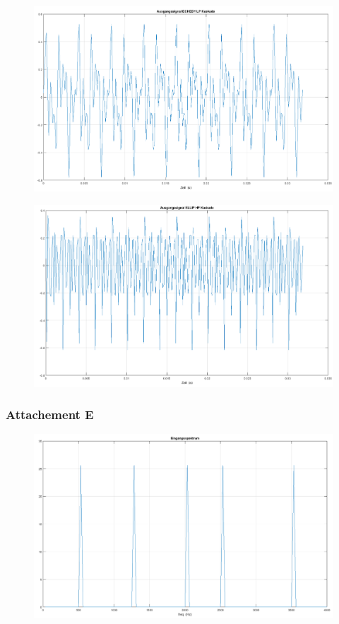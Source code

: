 \clearpage

\begin{figure}[h]
\centering
\includegraphics[width=0.7\linewidth]{Bilder/Attachment_D_Ausgangssignal_cheby_lp}
\caption{}
\label{fig:Attachment_D_Ausgangssignal_cheby_lp}
\end{figure}

\begin{figure}[h]
\centering
\includegraphics[width=0.7\linewidth]{Bilder/Attachment_D_Ausgangssignal_ellip_hp}
\caption{}
\label{fig:Attachment_D_Ausgangssignal_ellip_hp}
\end{figure}

\clearpage

\subsubsection{Attachement E}

\begin{figure}[h]
\centering
\includegraphics[width=0.7\linewidth]{Bilder/Attachment_E_Eingangsspektrum}
\caption{}
\label{fig:Attachment_E_Eingangsspektrum}
\end{figure}

